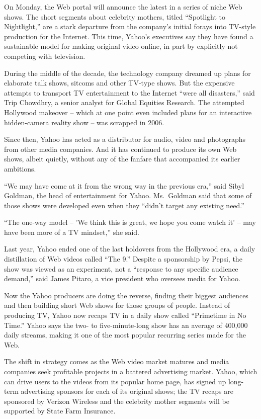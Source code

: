\documentclass[12pt,a4paper,onecolumn]{article}
\begin{document}
\begin{CJK*}{GBK}{song}
On Monday, the Web portal will announce the latest in a series of niche Web shows. The short
segments about celebrity mothers, titled ``Spotlight to Nightlight,'' are a stark departure from the
company's initial forays into TV-style production for the Internet. This time, Yahoo's executives
say they have found a sustainable model for making original video online, in part by explicitly not
competing with television.

During the middle of the decade, the technology company dreamed up plans for elaborate talk shows,
sitcoms and other TV-type shows. But the expensive attempts to transport TV entertainment to the
Internet ``were all disasters,'' said Trip Chowdhry, a senior analyst for Global Equities Research.
The attempted Hollywood makeover -- which at one point even included plans for an interactive
hidden-camera reality show -- was scrapped in 2006.

Since then, Yahoo has acted as a distributor for audio, video and photographs from other media
companies. And it has continued to produce its own Web shows, albeit quietly, without any of the
fanfare that accompanied its earlier ambitions.

``We may have come at it from the wrong way in the previous era,'' said Sibyl Goldman, the head of
entertainment for Yahoo. Ms.~Goldman said that some of those shows were developed even when they
``didn't target any existing need.''

``The one-way model -- 'We think this is great, we hope you come watch it' -- may have been more of
a TV mindset,'' she said.

Last year, Yahoo ended one of the last holdovers from the Hollywood era, a daily distillation of Web
videos called ``The 9.'' Despite a sponsorship by Pepsi, the show was viewed as an experiment, not a
``response to any specific audience demand,'' said James Pitaro, a vice president who oversees media
for Yahoo.

Now the Yahoo producers are doing the reverse, finding their biggest audiences and then building
short Web shows for those groups of people. Instead of producing TV, Yahoo now recaps TV in a daily
show called ``Primetime in No Time.'' Yahoo says the two- to five-minute-long show has an average of
400,000 daily streams, making it one of the most popular recurring series made for the Web.

The shift in strategy comes as the Web video market matures and media companies seek profitable
projects in a battered advertising market. Yahoo, which can drive users to the videos from its
popular home page, has signed up long-term advertising sponsors for each of its original shows; the
TV recaps are sponsored by Verizon Wireless and the celebrity mother segments will be supported by
State Farm Insurance.


\end{CJK*}
\end{document}
